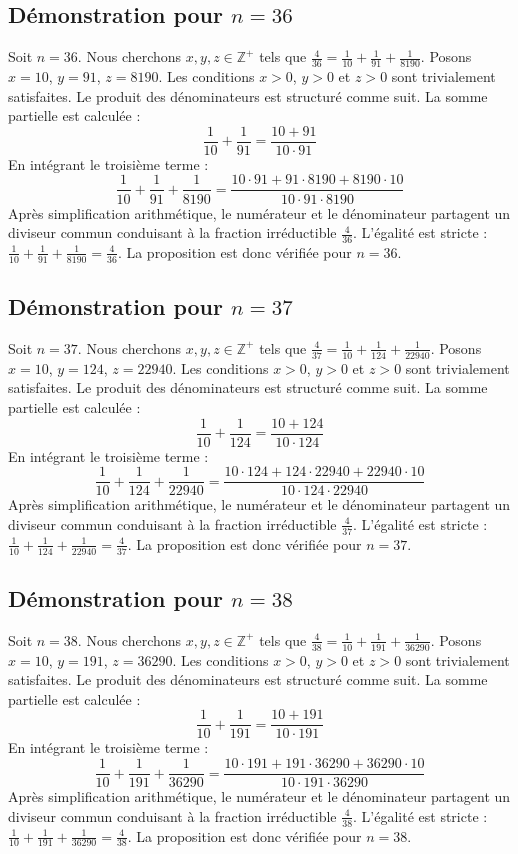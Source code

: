 \documentclass[11pt,a4paper]{article}
\begin{document}
\subsection{Démonstration pour $n = 36$}
Soit $n = 36$. Nous cherchons $x, y, z \in \mathbb{Z}^{+}$ tels que $\frac{4}{36} = \frac{1}{10} + \frac{1}{91} + \frac{1}{8190}$.
Posons $x = 10$, $y = 91$, $z = 8190$.
Les conditions $x > 0$, $y > 0$ et $z > 0$ sont trivialement satisfaites.
Le produit des dénominateurs est structuré comme suit. La somme partielle est calculée :
$$ \frac{1}{10} + \frac{1}{91} = \frac{10+91}{10 \cdot 91} $$
En intégrant le troisième terme :
$$ \frac{1}{10} + \frac{1}{91} + \frac{1}{8190} = \frac{10 \cdot 91 + 91 \cdot 8190 + 8190 \cdot 10}{10 \cdot 91 \cdot 8190} $$
Après simplification arithmétique, le numérateur et le dénominateur partagent un diviseur commun conduisant à la fraction irréductible $\frac{4}{36}$.
L'égalité est stricte : $\frac{1}{10} + \frac{1}{91} + \frac{1}{8190} = \frac{4}{36}$.
La proposition est donc vérifiée pour $n = 36$.
\subsection{Démonstration pour $n = 37$}
Soit $n = 37$. Nous cherchons $x, y, z \in \mathbb{Z}^{+}$ tels que $\frac{4}{37} = \frac{1}{10} + \frac{1}{124} + \frac{1}{22940}$.
Posons $x = 10$, $y = 124$, $z = 22940$.
Les conditions $x > 0$, $y > 0$ et $z > 0$ sont trivialement satisfaites.
Le produit des dénominateurs est structuré comme suit. La somme partielle est calculée :
$$ \frac{1}{10} + \frac{1}{124} = \frac{10+124}{10 \cdot 124} $$
En intégrant le troisième terme :
$$ \frac{1}{10} + \frac{1}{124} + \frac{1}{22940} = \frac{10 \cdot 124 + 124 \cdot 22940 + 22940 \cdot 10}{10 \cdot 124 \cdot 22940} $$
Après simplification arithmétique, le numérateur et le dénominateur partagent un diviseur commun conduisant à la fraction irréductible $\frac{4}{37}$.
L'égalité est stricte : $\frac{1}{10} + \frac{1}{124} + \frac{1}{22940} = \frac{4}{37}$.
La proposition est donc vérifiée pour $n = 37$.
\subsection{Démonstration pour $n = 38$}
Soit $n = 38$. Nous cherchons $x, y, z \in \mathbb{Z}^{+}$ tels que $\frac{4}{38} = \frac{1}{10} + \frac{1}{191} + \frac{1}{36290}$.
Posons $x = 10$, $y = 191$, $z = 36290$.
Les conditions $x > 0$, $y > 0$ et $z > 0$ sont trivialement satisfaites.
Le produit des dénominateurs est structuré comme suit. La somme partielle est calculée :
$$ \frac{1}{10} + \frac{1}{191} = \frac{10+191}{10 \cdot 191} $$
En intégrant le troisième terme :
$$ \frac{1}{10} + \frac{1}{191} + \frac{1}{36290} = \frac{10 \cdot 191 + 191 \cdot 36290 + 36290 \cdot 10}{10 \cdot 191 \cdot 36290} $$
Après simplification arithmétique, le numérateur et le dénominateur partagent un diviseur commun conduisant à la fraction irréductible $\frac{4}{38}$.
L'égalité est stricte : $\frac{1}{10} + \frac{1}{191} + \frac{1}{36290} = \frac{4}{38}$.
La proposition est donc vérifiée pour $n = 38$.
\end{document}
